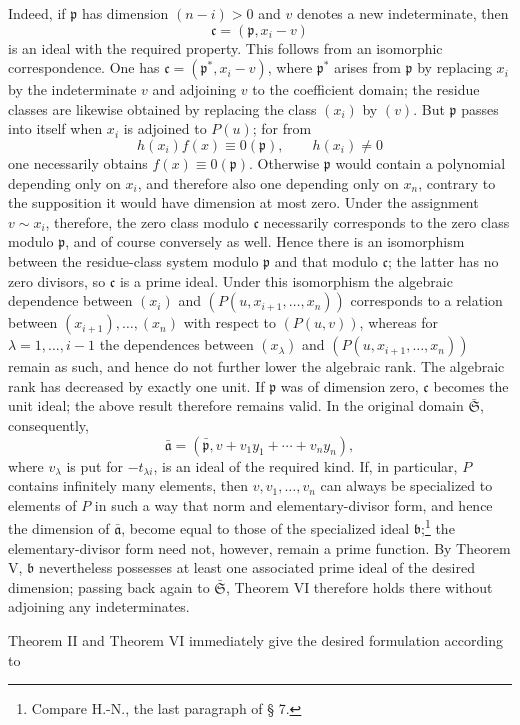 \documentclass[11pt]{article}
\providecommand{\frakS}{\mathfrak S}
\providecommand{\frakp}{\mathfrak p}
\providecommand{\fraka}{\mathfrak a}
\providecommand{\frakb}{\mathfrak b}
\providecommand{\frakc}{\mathfrak c}
\providecommand{\fraka}{\mathfrak a}
\providecommand{\frakc}{\mathfrak c}
\providecommand{\frakp}{\mathfrak p}
\providecommand{\frakp}{\mathfrak p}
\providecommand{\frakS}{\mathfrak S}
\begin{document}
Indeed, if $\frakp$ has dimension $(n-i)>0$ and $v$ denotes a new indeterminate, then
\[
 \frakc=(\frakp,x_i-v)
\]
is an ideal with the required property. This follows from an isomorphic correspondence. One has $\frakc=(\frakp^*,x_i-v)$, where $\frakp^*$ arises from $\frakp$ by replacing $x_i$ by the indeterminate $v$ and adjoining $v$ to the coefficient domain; the residue classes are likewise obtained by replacing the class $(x_i)$ by $(v)$. But $\frakp$ passes into itself when $x_i$ is adjoined to $P(u)$; for from
\[
 h(x_i)f(x)\equiv0(\frakp),\qquad h(x_i)\ne0
\]
one necessarily obtains $f(x)\equiv0(\frakp)$. Otherwise $\frakp$ would contain a polynomial depending only on $x_i$, and therefore also one depending only on $x_n$, contrary to the supposition it would have dimension at most zero. Under the assignment $v\sim x_i$, therefore, the zero class modulo $\frakc$ necessarily corresponds to the zero class modulo $\frakp$, and of course conversely as well. Hence there is an isomorphism between the residue-class system modulo $\frakp$ and that modulo $\frakc$; the latter has no zero divisors, so $\frakc$ is a prime ideal. Under this isomorphism the algebraic dependence between $(x_i)$ and $(P(u,x_{i+1},\ldots,x_n))$ corresponds to a relation between $(x_{i+1}),\ldots,(x_n)$ with respect to $(P(u,v))$, whereas for $\lambda=1,\ldots,i-1$ the dependences between $(x_\lambda)$ and $(P(u,x_{i+1},\ldots,x_n))$ remain as such, and hence do not further lower the algebraic rank. The algebraic rank has decreased by exactly one unit. If $\frakp$ was of dimension zero, $\frakc$ becomes the unit ideal; the above result therefore remains valid. In the original domain $\bar{\frakS}$, consequently,
\[
 \bar{\fraka}=(\bar{\frakp},v+v_1y_1+\cdots+v_ny_n),
\]
where $v_\lambda$ is put for $-t_{\lambda i}$, is an ideal of the required kind. If, in particular, $P$ contains infinitely many elements, then $v,v_1,\ldots,v_n$ can always be specialized to elements of $P$ in such a way that norm and elementary-divisor form, and hence the dimension of $\bar{\fraka}$, become equal to those of the specialized ideal $\frakb$;\footnote{Compare H.-N., the last paragraph of § 7.} the elementary-divisor form need not, however, remain a prime function. By Theorem V, $\frakb$ nevertheless possesses at least one associated prime ideal of the desired dimension; passing back again to $\bar{\frakS}$, Theorem VI therefore holds there without adjoining any indeterminates.

Theorem II and Theorem VI immediately give the desired formulation according to
\end{document}
